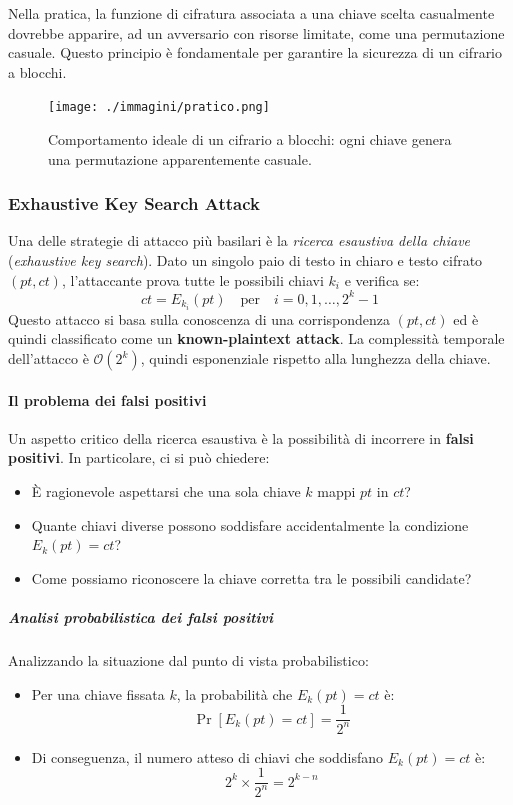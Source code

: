 \documentclass{report}
\begin{document}
Nella pratica, la funzione di cifratura associata a una chiave scelta casualmente dovrebbe apparire, ad un avversario con risorse limitate, come una permutazione casuale.  
Questo principio è fondamentale per garantire la sicurezza di un cifrario a blocchi.

\begin{figure}[h]
    \centering
    \texttt{[image: ./immagini/pratico.png]} %
    \caption{Comportamento ideale di un cifrario a blocchi: ogni chiave genera una permutazione apparentemente casuale.}
\end{figure}

\subsubsection{Exhaustive Key Search Attack}

Una delle strategie di attacco più basilari è la \textit{ricerca esaustiva della chiave} (\textit{exhaustive key search}).  
Dato un singolo paio di testo in chiaro e testo cifrato $(pt, ct)$, l'attaccante prova tutte le possibili chiavi $k_i$ e verifica se:
\[
ct = E_{k_i}(pt) \quad \text{per}\quad i = 0, 1, \dots, 2^k - 1
\]
Questo attacco si basa sulla conoscenza di una corrispondenza $(pt, ct)$ ed è quindi classificato come un \textbf{known-plaintext attack}.  
La complessità temporale dell'attacco è $\mathcal{O}(2^k)$, quindi esponenziale rispetto alla lunghezza della chiave.

\paragraph{Il problema dei falsi positivi}

Un aspetto critico della ricerca esaustiva è la possibilità di incorrere in \textbf{falsi positivi}.  
In particolare, ci si può chiedere:
\begin{itemize}
    \item È ragionevole aspettarsi che una sola chiave $k$ mappi $pt$ in $ct$?
    \item Quante chiavi diverse possono soddisfare accidentalmente la condizione $E_k(pt) = ct$?
    \item Come possiamo riconoscere la chiave corretta tra le possibili candidate?
\end{itemize}

\subparagraph{Analisi probabilistica dei falsi positivi}

Analizzando la situazione dal punto di vista probabilistico:
\begin{itemize}
    \item Per una chiave fissata $k$, la probabilità che $E_k(pt) = ct$ è:
    \[
    \Pr[E_k(pt) = ct] = \frac{1}{2^n}
    \]
    \item Di conseguenza, il numero atteso di chiavi che soddisfano $E_k(pt) = ct$ è:
    \[
    2^k \times \frac{1}{2^n} = 2^{k-n}
    \]
\end{itemize}
\end{document}
